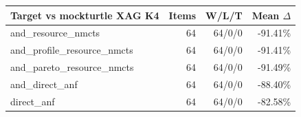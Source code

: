 \begin{tabular}{lrrr}
\toprule
Target vs mockturtle XAG K4 & Items & W/L/T & Mean $\Delta$ \\
\midrule
and\_resource\_nmcts & 64 & 64/0/0 & -91.41\% \\
and\_profile\_resource\_nmcts & 64 & 64/0/0 & -91.41\% \\
and\_pareto\_resource\_nmcts & 64 & 64/0/0 & -91.49\% \\
and\_direct\_anf & 64 & 64/0/0 & -88.40\% \\
direct\_anf & 64 & 64/0/0 & -82.58\% \\
\bottomrule
\end{tabular}
